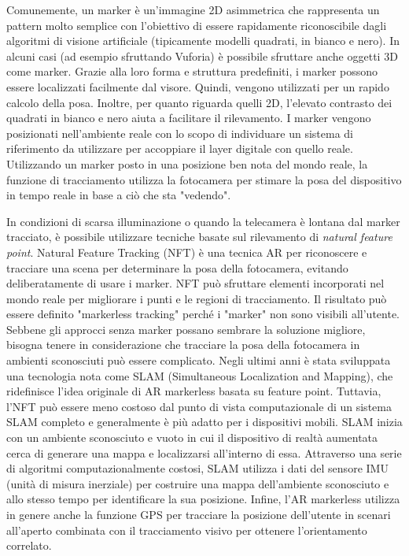 Comunemente, un marker è un'immagine 2D asimmetrica che rappresenta un pattern molto semplice con l'obiettivo di essere rapidamente riconoscibile dagli algoritmi di visione artificiale (tipicamente modelli quadrati, in bianco e nero). In alcuni casi (ad esempio sfruttando Vuforia) è possibile sfruttare anche oggetti 3D come marker.
Grazie alla loro forma e struttura predefiniti, i marker possono essere localizzati facilmente dal visore. Quindi, vengono utilizzati per un rapido calcolo della posa.
Inoltre, per quanto riguarda quelli 2D, l'elevato contrasto dei quadrati in bianco e nero aiuta a facilitare il rilevamento.
I marker vengono posizionati nell'ambiente reale con lo scopo di individuare un sistema di riferimento da utilizzare per accoppiare il layer digitale con quello reale. Utilizzando un marker posto in una posizione ben nota del mondo reale, la funzione di tracciamento utilizza la fotocamera per stimare la posa del dispositivo in tempo reale in base a ciò che sta "vedendo". 

In condizioni di scarsa illuminazione o quando la telecamera è lontana dal marker tracciato, è possibile utilizzare tecniche basate sul rilevamento di \textit{natural feature point}.
Natural Feature Tracking (NFT) è una tecnica AR per riconoscere e tracciare una scena per determinare la posa della fotocamera, evitando deliberatamente di usare i marker.
NFT può sfruttare elementi incorporati nel mondo reale per migliorare i punti e le regioni di tracciamento. Il risultato può essere definito "markerless tracking" perché i "marker" non sono visibili all'utente.
Sebbene gli approcci senza marker possano sembrare la soluzione migliore, bisogna tenere in considerazione che tracciare la posa della fotocamera in ambienti sconosciuti può essere complicato. Negli ultimi anni è stata sviluppata una tecnologia nota come SLAM (Simultaneous Localization and Mapping), che ridefinisce l'idea originale di AR markerless basata su feature point. Tuttavia, l'NFT può essere meno costoso dal punto di vista computazionale di un sistema SLAM completo e generalmente è più adatto per i dispositivi mobili.
SLAM inizia con un ambiente sconosciuto e vuoto in cui il dispositivo di realtà aumentata cerca di generare una mappa e localizzarsi all'interno di essa. Attraverso una serie di algoritmi computazionalmente costosi, SLAM utilizza i dati del sensore IMU (unità di misura inerziale) per costruire una mappa dell'ambiente sconosciuto e allo stesso tempo per identificare la sua posizione.
Infine, l'AR markerless utilizza in genere anche la funzione GPS per tracciare la posizione dell'utente in scenari all'aperto combinata con il tracciamento visivo per ottenere l'orientamento correlato. 

